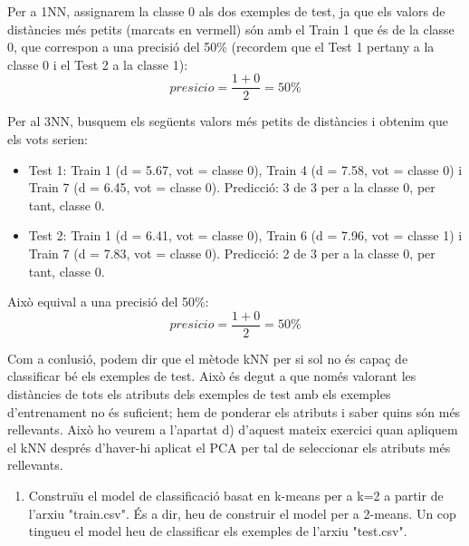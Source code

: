 \documentclass{article} %
\begin{document}
{	Per a 1NN, assignarem la classe 0 als dos exemples de test, ja que els valors de distàncies més petits (marcats en vermell) són amb el Train 1 que és de la classe 0, que correspon a una precisió del 50\% (recordem que el Test 1 pertany a la classe 0 i el Test 2 a la classe 1):
	\[presicio = \frac{1 + 0}{2} = 50\%\]

	
	Per al 3NN, busquem els següents valors més petits de distàncies i obtenim que els vots serien:

	\begin{itemize}
		\item Test 1: Train 1 (d = 5.67, vot = classe 0), Train 4 (d = 7.58, vot = classe 0) i Train 7 (d = 6.45, vot = classe 0). Predicció: 3 de 3 per a la classe 0, per tant, classe 0.
		\item Test 2: Train 1 (d = 6.41, vot = classe 0), Train 6 (d = 7.96, vot = classe 1) i Train 7 (d = 7.83, vot = classe 0). Predicció: 2 de 3 per a la classe 0, per tant, classe 0.
	\end{itemize}

	Això equival a una precisió del 50\%:
	\[presicio = \frac{1 + 0}{2} = 50\%\]

	Com a conlusió, podem dir que el mètode kNN per si sol no és capaç de classificar bé els exemples de test. Això és degut a que només valorant les distàncies de tots els atributs dels exemples de test amb els exemples d'entrenament no és suficient; hem de ponderar els atributs i saber quins són més rellevants. Això ho veurem a l'apartat d) d'aquest mateix exercici quan apliquem el kNN després d'haver-hi aplicat el PCA per tal de seleccionar els atributs més rellevants.
}
\begin{enumerate}[resume, label=\alph*]
	\item Construïu el model de classificació basat en k-means per a k=2 a partir de l'arxiu "train.csv". És a dir, heu de construir el model per a 2-means. Un cop tingueu el model heu de classificar els exemples de l'arxiu "test.csv".
\end{enumerate}
\end{document}
